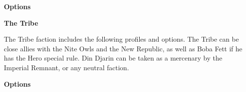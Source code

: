\documentclass{article}
\begin{document}
\vspace{0.3cm}
{\scriptsize
\setlength\extrarowheight{1.5pt}

}
\vspace{0.6cm}

{\large \textbf{Options}}
\vspace{0.3cm}
\begin{multicols}{2}
    {\scriptsize

    \setlength\extrarowheight{1.5pt}
    

    }
\end{multicols}

\newpage

{\Large \textbf{The Tribe}}
\vspace{0.3cm}

\begin{minipage}{19cm}
    The Tribe faction includes the following profiles and options.
    The Tribe can be close allies with the Nite Owls and the New Republic, as well as
    Boba Fett if he has the Hero special rule.
    Din Djarin can be taken as a mercenary by the Imperial Remnant,
    or any neutral faction.
\end{minipage}

\vspace{0.3cm}
{\scriptsize
\setlength\extrarowheight{1.5pt}

}
\vspace{0.6cm}

{\large \textbf{Options}}
\vspace{0.3cm}
\begin{multicols}{2}
    {\scriptsize

    \setlength\extrarowheight{1.5pt}
    

    \vspace{0.6cm}
    
    \setlength\extrarowheight{1.5pt}
    

    \vspace{0.6cm}

    \setlength\extrarowheight{1.5pt}
    

    \vspace{0.6cm}

    \setlength\extrarowheight{1.5pt}
    

    \vspace{0.6cm}

    \setlength\extrarowheight{1.5pt}
    
    
    }
\end{multicols}
\end{document}
